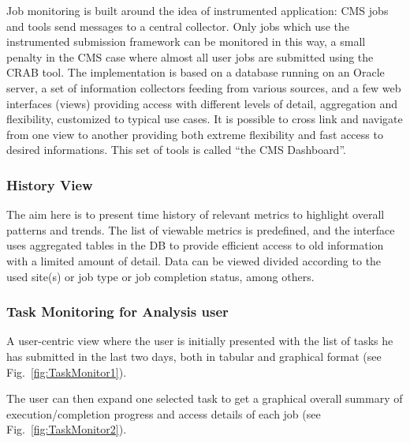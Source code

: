 Job monitoring is built around the idea of instrumented
application: CMS jobs and tools send messages
to a central collector. Only jobs which use the
instrumented submission framework can be monitored in this way,
a small penalty in the CMS case where almost
all user jobs are submitted using the CRAB tool.
The implementation is based on a
database running on an Oracle server, a set of information collectors
feeding from various sources, 
and a few web interfaces (views) providing access with different levels
of detail, aggregation and flexibility, customized to
typical use cases. It is possible to cross link and navigate
from one view to another providing both extreme flexibility
and fast access to desired informations.
This set of tools is called ``the CMS Dashboard''.

\subsubsection{History View}
The aim here is to present time history of relevant
metrics to highlight overall patterns and trends.
The list of viewable metrics is predefined, and
the interface uses aggregated tables in the DB to provide
efficient access to old information with a limited
amount of detail. Data can be viewed divided
according to the used site(s) or job type or job completion status, among others.

\subsubsection{Task Monitoring for Analysis user}
A user-centric view where the user is
initially presented with the list of tasks he has submitted in the last
two days, both in tabular and graphical format (see Fig.~\ref{fig:TaskMonitor1}).

The user can then expand one selected task to get
a graphical overall summary of execution/completion progress
and access details of each job (see Fig.~\ref{fig:TaskMonitor2}).


